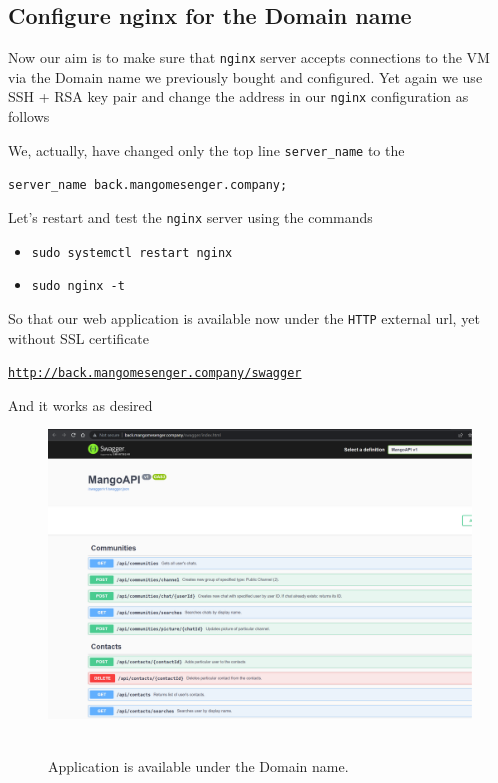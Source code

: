 \subsection{Configure nginx for the Domain name}\label{subsec:configure-nginx-for-the-domain-name}
Now our aim is to make sure that \texttt{nginx} server accepts connections to the VM via the Domain name we
previously bought and configured.
Yet again we use SSH + RSA key pair and change the address in our \texttt{nginx} configuration as follows

We, actually, have changed only the top line \texttt{server\_name} to the
\begin{center}
    \texttt{server\_name back.mangomesenger.company;}
\end{center}
Let's restart and test the \texttt{nginx} server using the commands
\begin{itemize}
    \item \texttt{sudo systemctl restart nginx}
    \item \texttt{sudo nginx -t}
\end{itemize}
So that our web application is available now under the \texttt{HTTP} external url, yet without SSL certificate
\begin{center}
    \href{http://back.mangomesenger.company/swagger}{\texttt{http://back.mangomesenger.company/swagger}}
\end{center}
And it works as desired
\begin{figure}[H]
    \centering
    \includegraphics[width=1\textwidth]{img/07_swagger_under_domain_name}
    ~\caption{Application is available under the Domain name.}\label{fig:figure20}
\end{figure}

